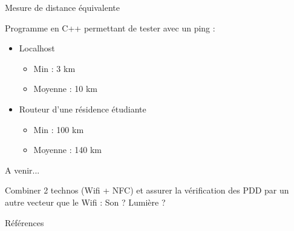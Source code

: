 \documentclass[aspectratio=169]{beamer}
\begin{document}
\begin{frame}{Mesure de distance équivalente}
        
    Programme en C++ permettant de tester avec un ping :
    \begin{itemize}
        \item Localhost
        \begin{itemize}
            \item Min : 3 km
            \item Moyenne : 10 km
        \end{itemize}
        \item Routeur d'une résidence étudiante
        \begin{itemize}
            \item Min : 100 km
            \item Moyenne : 140 km
        \end{itemize}
    \end{itemize}

\end{frame}

\begin{frame}{A venir...}
    
    Combiner 2 technos (Wifi + NFC) et assurer la vérification des PDD par un autre vecteur que le Wifi : Son ? Lumière ?
    
\end{frame}

\begin{frame}{Références}
  \printbibliography
\end{frame}
\end{document}
